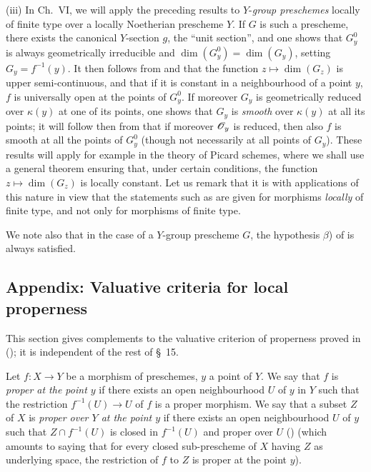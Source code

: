 \begin{remarks}[15.6.10]
(iii)
In Ch.\ VI, we will apply the preceding results to $Y$-\emph{group preschemes} locally of finite type over a locally Noetherian prescheme $Y$.
If $G$ is such a prescheme, there exists the canonical $Y$-section $g$, the ``unit section'', and one shows that $G_y^0$ is always geometrically irreducible and $\dim(G_y^0)=\dim(G_y)$, setting $G_y=f^{-1}(y)$.
It then follows from  and  that the function $z\mapsto\dim(G_z)$ is upper semi-continuous, and that if it is constant in a neighbourhood of a point $y$, $f$ is universally open at the points of $G_y^0$.
If moreover $G_y$ is geometrically reduced over $\kappa(y)$ at one of its points, one shows that $G_y$ is \emph{smooth}  over $\kappa(y)$ at all its points; it will follow then from  that if moreover $\mathscr{O}_y$ is reduced, then also $f$ is smooth at all the points of $G_y^0$ (though not necessarily at all points of $G_y$).
These results will apply for example in the theory of Picard schemes, where we shall use a general theorem ensuring that, under certain conditions, the function $z\mapsto\dim(G_z)$ is locally constant.
Let us remark that it is with applications of this nature in view that the statements such as  are given for morphisms \emph{locally} of finite type, and not only for morphisms of finite type.

We note also that in the case of a $Y$-group prescheme $G$, the hypothesis $\beta$) of  is always satisfied.
\end{remarks}


\subsection{Appendix: Valuative criteria for local properness}
\label{subsection:IV.15.7}

This section gives complements to the valuative criterion of properness proved in (); it is independent of the rest of \S~15.

\begin{definition}[15.7.1]
\label{IV.15.7.1}
Let $f:X\to Y$ be a morphism of preschemes, $y$ a point of $Y$.
We say that $f$ is \emph{proper at the point $y$} if there exists an open neighbourhood $U$ of $y$ in $Y$ such that the restriction $f^{-1}(U)\to U$ of $f$ is a proper morphism.
We say that a subset $Z$ of $X$ is \emph{proper over $Y$ at the point $y$} if there exists an open neighbourhood $U$ of $y$ such that $Z\cap f^{-1}(U)$ is closed in $f^{-1}(U)$ and proper over $U$ () (which amounts to saying that for every closed sub-prescheme of $X$ having $Z$ as underlying space, the restriction of $f$ to $Z$ is proper at the point $y$).
\end{definition}

